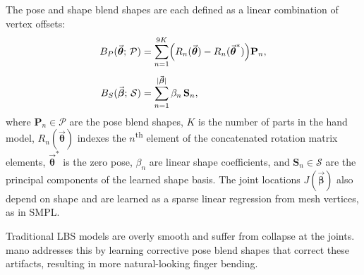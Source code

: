 The pose and shape blend shapes are each defined as a linear combination
of vertex offsets:
\begin{align}
  B_P(\vec{\boldsymbol{\theta}};\,\mathcal{P})
  &= \sum_{n=1}^{9K}
     \Bigl(R_n(\vec{\boldsymbol{\theta}}) - R_n(\vec{\boldsymbol{\theta}}^*)\Bigr)
     \mathbf{P}_n,
  \label{eq:mano_bp}\\[4pt]
  B_S(\vec{\boldsymbol{\beta}};\,\mathcal{S})
  &= \sum_{n=1}^{|\vec{\boldsymbol{\beta}}|}
     \beta_n\,\mathbf{S}_n,
  \label{eq:mano_bs}
\end{align}
where $\mathbf{P}_n \in \mathcal{P}$ are the pose blend shapes, $K$ is the
number of parts in the hand model, $R_n(\vec{\boldsymbol{\theta}})$ indexes
the $n$\textsuperscript{th} element of the concatenated rotation matrix
elements, $\vec{\boldsymbol{\theta}}^*$ is the zero pose, $\beta_n$ are
linear shape coefficients, and $\mathbf{S}_n \in \mathcal{S}$ are the
principal components of the learned shape basis.
The joint locations $J(\vec{\boldsymbol{\beta}})$ also depend on shape and
are learned as a sparse linear regression from mesh vertices, as in SMPL.

Traditional LBS models are overly smooth and suffer from collapse at the
joints. \acrshort{mano} addresses this by learning corrective pose blend shapes that
correct these artifacts, resulting in more natural-looking finger bending.
